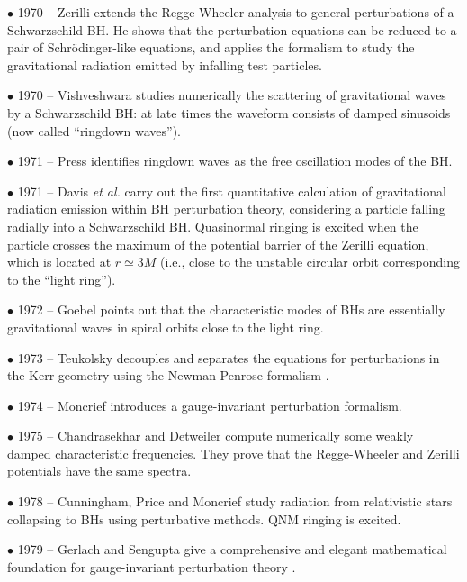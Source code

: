 \documentclass[]{iopart}
\begin{document}
\noindent $\bullet$ 1970 -- Zerilli \cite{Zerilli:1970se,Zerilli:1971wd}
extends the Regge-Wheeler analysis to general perturbations of a Schwarzschild
BH. He shows that the perturbation equations can be reduced to a pair of
Schr\"odinger-like equations, and applies the formalism to study the
gravitational radiation emitted by infalling test particles.

\noindent $\bullet$ 1970 -- Vishveshwara \cite{vish} studies numerically the
scattering of gravitational waves by a Schwarzschild BH: at late times the
waveform consists of damped sinusoids (now called ``ringdown waves'').

\noindent $\bullet$ 1971 -- Press \cite{pressringdown} identifies ringdown
waves as the free oscillation modes of the BH.

\noindent $\bullet$ 1971 -- Davis {\it et al.} \cite{Davis:1971gg} carry out
the first quantitative calculation of gravitational radiation emission within
BH perturbation theory, considering a particle falling radially into a
Schwarzschild BH. Quasinormal ringing is excited when the particle crosses the
maximum of the potential barrier of the Zerilli equation, which is located at
$r\simeq 3M$ (i.e., close to the unstable circular orbit corresponding to the
``light ring'').

\noindent $\bullet$ 1972 -- Goebel \cite{goebel} points out that the
characteristic modes of BHs are essentially gravitational waves in spiral
orbits close to the light ring.

\noindent $\bullet$ 1973 -- Teukolsky \cite{Teukolsky:1972my} decouples and
separates the equations for perturbations in the Kerr geometry using the
Newman-Penrose formalism \cite{Newman:1961qr}.

\noindent $\bullet$ 1974 -- Moncrief \cite{Moncrief:1974am} introduces a
gauge-invariant perturbation formalism.

\noindent $\bullet$ 1975 -- Chandrasekhar and Detweiler
\cite{Chandrasekhar:1975qn} compute numerically some weakly damped
characteristic frequencies. They prove that the Regge-Wheeler and Zerilli
potentials have the same spectra.

\noindent $\bullet$ 1978 -- Cunningham, Price and Moncrief
\cite{Cunningham1,Cunningham2,Cunningham3} study radiation from relativistic
stars collapsing to BHs using perturbative methods. QNM ringing is excited.

\noindent $\bullet$ 1979 -- Gerlach and Sengupta give a comprehensive and
elegant mathematical foundation for gauge-invariant perturbation theory
\cite{Gerlach:1979rw,Gerlach:1980tx}.
\end{document}

